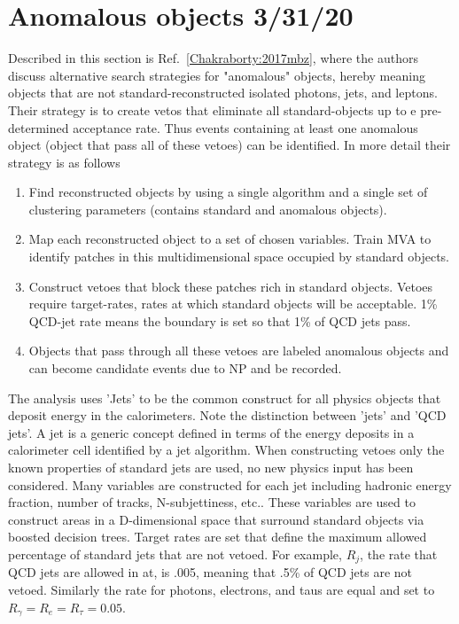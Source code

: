 \documentclass[aps,onecolumn,twoside,secnumarabic,balancelastpage,amsmath,amssymb,nofootinbib,hyperref=pdftex]{revtex4}
\begin{document}
\section{ Anomalous objects \tiny{3/31/20}}
Described in this section is Ref.~\ref{Chakraborty:2017mbz}, where the authors discuss alternative search strategies for "anomalous" objects, hereby meaning objects that are not standard-reconstructed isolated photons, jets, and leptons. Their strategy is to create vetos that eliminate all standard-objects up to e pre-determined acceptance rate. Thus events containing at least one anomalous object (object that pass all of these vetoes) can be identified. In more detail their strategy is as follows 

\begin{enumerate}
\item  Find reconstructed objects by using a single algorithm and a single set of clustering parameters (contains standard and anomalous objects).
\item Map each reconstructed object to a set of chosen variables. Train MVA to identify patches in this multidimensional space occupied by standard objects.
\item Construct vetoes that block these patches rich in standard objects. Vetoes require target-rates, rates at which standard objects will be acceptable. 1\% QCD-jet rate means the boundary is set so that 1\% of QCD jets pass.
\item Objects that pass through all these vetoes are labeled anomalous objects and can become candidate events due to NP and be recorded.
\end{enumerate}
The analysis uses 'Jets' to be the common construct for all physics objects that deposit energy in the calorimeters. Note the distinction between 'jets' and 'QCD jets'. A jet is a generic concept defined in terms of the energy deposits in a calorimeter cell identified by a jet algorithm. When constructing vetoes only the known properties of standard jets are used, no new physics input has been considered.
\vskip 0.12in
Many variables are constructed for each jet including hadronic energy fraction, number of tracks, N-subjettiness, etc.. These variables are used to construct areas in a D-dimensional space that surround standard objects via boosted decision trees. Target rates are set that define the maximum allowed percentage of standard jets that are not vetoed. For example, $R_{j}$, the rate that QCD jets are allowed in at, is .005, meaning that .5\% of QCD jets are not vetoed. Similarly the rate for photons, electrons, and taus are equal and set to $R_{\gamma} = R_{e} = R_{\tau} = 0.05$. 
\end{document}
